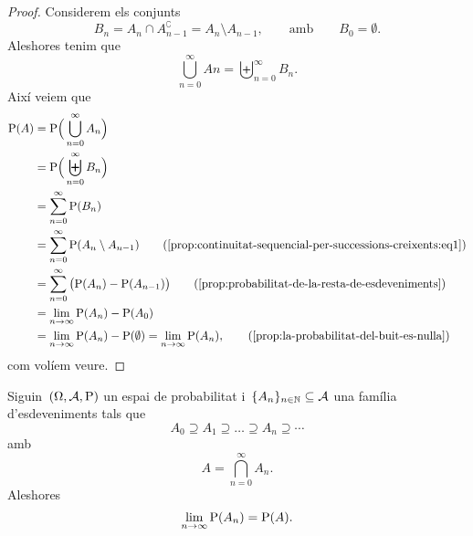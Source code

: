 \documentclass[../probabilitat.tex]{subfiles}
\begin{document}
    \begin{proof}
        Considerem els conjunts
        \begin{equation}
            \label{prop:continuitat-sequencial-per-successions-creixents:eq1}
            B_{n}=A_{n}\cap A_{n-1}^{\complement}=A_{n}\setminus A_{n-1},\qquad\text{amb}\qquad B_{0}=\emptyset.
        \end{equation}
        Aleshores tenim que %
        \[
            \bigcup_{n=0}^{\infty}A{n}=\biguplus_{n=0}^{\infty}B_{n}.
        \]
        Així veiem que
        \begin{align*}
            \Probabilitat(A)&=\Probabilitat\Big(\bigcup_{n=0}^{\infty}A_{n}\Big) \\
            &=\Probabilitat\Big(\biguplus_{n=0}^{\infty}B_{n}\Big) \\
            &=\sum_{n=0}^{\infty}\Probabilitat(B_{n}) \\
            &=\sum_{n=0}^{\infty}\Probabilitat(A_{n}\setminus A_{n-1}) \tag{\ref{prop:continuitat-sequencial-per-successions-creixents:eq1}}\\
            &=\sum_{n=0}^{\infty}\big(\Probabilitat(A_{n})-\Probabilitat(A_{n-1})\big)\tag{\ref{prop:probabilitat-de-la-resta-de-esdeveniments}} \\
            &=\lim_{n\to\infty}\Probabilitat(A_{n})-\Probabilitat(A_{0}) \\
            &=\lim_{n\to\infty}\Probabilitat(A_{n})-\Probabilitat(\emptyset)=\lim_{n\to\infty}\Probabilitat(A_{n}), \tag{\ref{prop:la-probabilitat-del-buit-es-nulla}}
        \end{align*}
        com volíem veure.
    \end{proof}
    \begin{proposition}
        \label{prop:continuitat-sequencial-per-successions-decreixents}
        Siguin~\((\Omega,\mathcal{A},\mathrm{P})\) un espai de probabilitat i~\(\{A_{n}\}_{n\in\mathbb{N}}\subseteq\mathcal{A}\) una família d'esdeveniments tals que
        \[
            A_{0}\supseteq A_{1}\supseteq\dots\supseteq A_{n}\supseteq\cdots
        \]
        amb
        \[
            A=\bigcap_{n=0}^{\infty}A_{n}.
        \]
        Aleshores
        \[
            \lim_{n\to\infty}\mathrm{P}(A_{n})=\mathrm{P}(A).
        \]
    \end{proposition}
\end{document}
